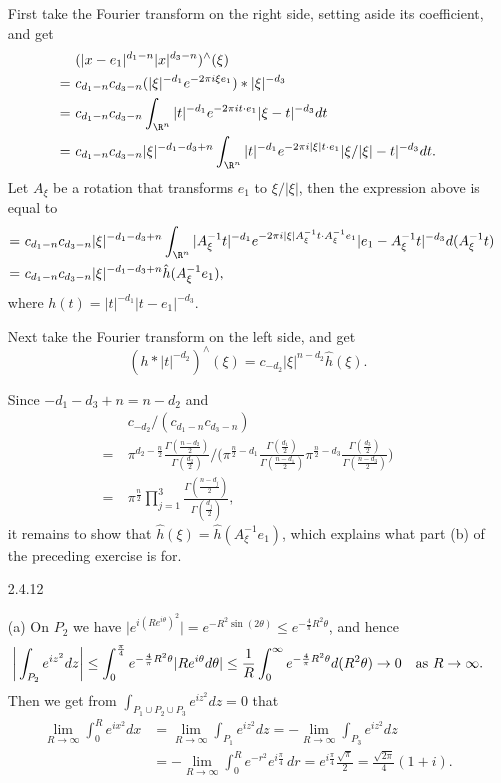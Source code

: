 \begin{itemize}
First take the Fourier transform on the right side, setting aside its coefficient, and get
\begin{align*}
    &(|x-e_1|^{d_1-n}|x|^{d_3-n})^\wedge(\xi)\\
    =\ &c_{d_1-n}c_{d_3-n}(|\xi|^{-d_1}e^{-2\pi i\xi e_1})*|\xi|^{-d_3}\\
    =\ &c_{d_1-n}c_{d_3-n}\int_{\R^n}|t|^{-d_1}e^{-2\pi it\cdot e_1}|\xi-t|^{-d_3}dt\\
    =\ &c_{d_1-n}c_{d_3-n}|\xi|^{-d_1-d_3+n}\int_{\R^n}|t|^{-d_1}e^{-2\pi i|\xi|t\cdot e_1}|\xi/|\xi|-t|^{-d_3}dt.
\end{align*}
Let $A_\xi$ be a rotation that transforms $e_1$ to $\xi/|\xi|$, then the expression above is equal to
\begin{align*}
    =\ &c_{d_1-n}c_{d_3-n}|\xi|^{-d_1-d_3+n}\int_{\R^n}|A_\xi^{-1}t|^{-d_1}e^{-2\pi i|\xi|A_\xi^{-1}t\cdot A_\xi^{-1}e_1}|e_1-A_\xi^{-1}t|^{-d_3}d(A_\xi^{-1}t)\\
    =\ &c_{d_1-n}c_{d_3-n}|\xi|^{-d_1-d_3+n}\hat{h}(A_\xi^{-1}e_1),
\end{align*}
where $h(t)=|t|^{-d_1}|t-e_1|^{-d_3}$.

Next take the Fourier transform on the left side, and get
$$(h*|t|^{-d_2})^\wedge(\xi)=c_{-d_2}|\xi|^{n-d_2}\hat{h}(\xi).$$

Since $-d_1-d_3+n=n-d_2$ and 
\begin{align*}
&c_{-d_2}/(c_{d_1-n}c_{d_3-n})\\
=\ &\pi^{d_2-\frac{n}{2}}\frac{\varGamma(\frac{n-d_2}{2})}{\varGamma(\frac{d_2}{2})}\bigg/
\bigg(\pi^{\frac{n}{2}-d_1}\frac{\varGamma(\frac{d_1}{2})}{\varGamma(\frac{n-d_1}{2})}
\pi^{\frac{n}{2}-d_3}\frac{\varGamma(\frac{d_3}{2})}{\varGamma(\frac{n-d_3}{2})}\bigg)\\
=\ &\pi^\frac{n}{2}\prod_{j=1}^3\frac{\varGamma(\frac{n-d_j}{2})}{\varGamma(\frac{d_j}{2})},
\end{align*}
it remains to show that $\hat{h}(\xi)=\hat{h}(A_\xi^{-1}e_1)$, 
which explains what part (b) of the preceding exercise is for.

\item[2.4.12]

(a) On $P_2$ we have $\big|e^{i(Re^{i\theta})^2}\big|
=e^{-R^2\sin(2\theta)}\leq e^{-\frac{4}{\pi}R^2\theta}$, and hence
$$\bigg|\int_{P_2}e^{iz^2}dz\bigg|
\leq \int_0^\frac{\pi}{4} e^{-\frac{4}{\pi}R^2\theta}|Re^{i\theta}d\theta|
\leq \frac{1}{R}\int_0^\infty e^{-\frac{4}{\pi}R^2\theta}d(R^2\theta)
\rightarrow0\quad\textup{as }R\rightarrow\infty.$$
Then we get from $\int_{P_1\cup P_2\cup P_3}e^{iz^2}dz=0$ that
\begin{align*}
    \lim_{R\rightarrow\infty}\int_0^R e^{ix^2}dx
    &=\lim_{R\rightarrow\infty}\int_{P_1} e^{iz^2}dz
    =-\lim_{R\rightarrow\infty}\int_{P_3} e^{iz^2}dz\\
    &=-\lim_{R\rightarrow\infty}\int_0^R e^{-r^2}e^{i\frac{\pi}{4}}\,dr
    =e^{i\frac{\pi}{4}}\frac{\sqrt{\pi}}{2}
    =\frac{\sqrt{2\pi}}{4}(1+i).
\end{align*}


\end{itemize}
